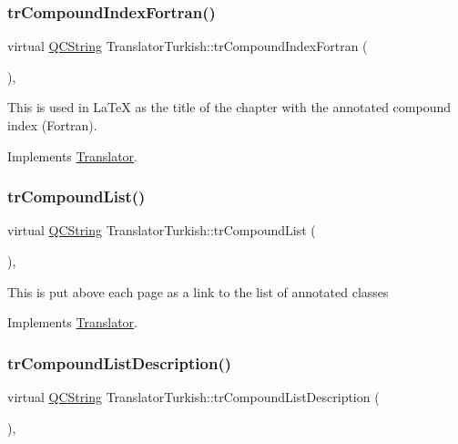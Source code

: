 \subsubsection{\texorpdfstring{trCompoundIndexFortran()}{trCompoundIndexFortran()}}
{\footnotesize\ttfamily virtual \mbox{\hyperlink{class_q_c_string}{Q\+C\+String}} Translator\+Turkish\+::tr\+Compound\+Index\+Fortran (\begin{DoxyParamCaption}{ }\end{DoxyParamCaption})\hspace{0.3cm}{\ttfamily [inline]}, {\ttfamily [virtual]}}

This is used in La\+TeX as the title of the chapter with the annotated compound index (Fortran). 

Implements \mbox{\hyperlink{class_translator}{Translator}}.

\mbox{\label{class_translator_turkish_adea72f70ee884eb16cc3fe18f079e827}} 
\subsubsection{\texorpdfstring{trCompoundList()}{trCompoundList()}}
{\footnotesize\ttfamily virtual \mbox{\hyperlink{class_q_c_string}{Q\+C\+String}} Translator\+Turkish\+::tr\+Compound\+List (\begin{DoxyParamCaption}{ }\end{DoxyParamCaption})\hspace{0.3cm}{\ttfamily [inline]}, {\ttfamily [virtual]}}

This is put above each page as a link to the list of annotated classes 

Implements \mbox{\hyperlink{class_translator}{Translator}}.

\mbox{\label{class_translator_turkish_a10d51562338bfd4f290ebca764fd8f64}} 
\subsubsection{\texorpdfstring{trCompoundListDescription()}{trCompoundListDescription()}}
{\footnotesize\ttfamily virtual \mbox{\hyperlink{class_q_c_string}{Q\+C\+String}} Translator\+Turkish\+::tr\+Compound\+List\+Description (\begin{DoxyParamCaption}{ }\end{DoxyParamCaption})\hspace{0.3cm}{\ttfamily [inline]}, {\ttfamily [virtual]}}

